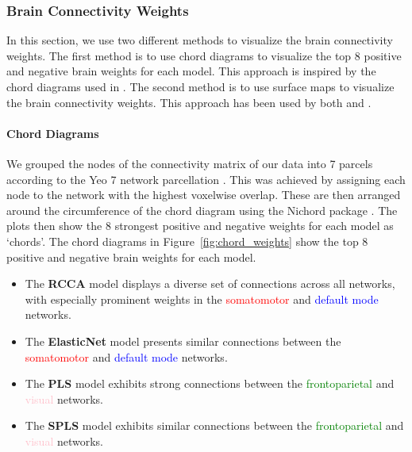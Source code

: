 \subsubsection{Brain Connectivity Weights}

In this section, we use two different methods to visualize the brain connectivity weights.
The first method is to use chord diagrams to visualize the top 8 positive and negative brain \gls{weights} for each model.
This approach is inspired by the chord diagrams used in \cite{smith2015positive}.
The second method is to use surface maps to visualize the brain connectivity weights.
This approach has been used by both \cite{ferreira2022hierarchical} and \cite{smith2015positive}.

\paragraph{Chord Diagrams}
We grouped the nodes of the connectivity matrix of our data into 7 parcels according to the Yeo 7 network parcellation \cite{yeo2011organization}.
This was achieved by assigning each node to the network with the highest voxelwise overlap.
These are then arranged around the circumference of the chord diagram using the Nichord package \citep{bogdan2023connsearch}.
The plots then show the 8 strongest positive and negative \gls{weights} for each model as `chords'.
The chord diagrams in Figure~\ref{fig:chord_weights} show the top 8 positive and negative brain \gls{weights} for each model.

\begin{itemize}
    \item The \textbf{RCCA} model displays a diverse set of connections across all networks, with especially prominent weights in the \textcolor{red}{somatomotor} and \textcolor{blue}{default mode} networks.

    \item The \textbf{ElasticNet} model presents similar connections between the \textcolor{red}{somatomotor} and \textcolor{blue}{default mode} networks.

    \item The \textbf{PLS} model exhibits strong connections between the \textcolor{green}{frontoparietal} and \textcolor{pink}{visual} networks.

    \item The \textbf{SPLS} model exhibits similar connections between the \textcolor{green}{frontoparietal} and \textcolor{pink}{visual} networks.
\end{itemize}


